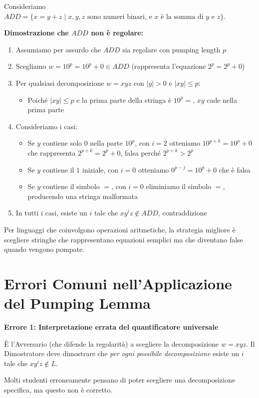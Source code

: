 \documentclass[12pt,a4paper]{article}
\begin{document}
\begin{risoluzione}
Consideriamo $ADD = \{x=y+z\mid x,y,z \text{ sono numeri binari, e } x \text{ è la somma di } y \text{ e } z\}$.

\textbf{Dimostrazione che $ADD$ non è regolare:}
\begin{enumerate}
    \item Assumiamo per assurdo che $ADD$ sia regolare con pumping length $p$
    \item Scegliamo $w = 10^p=10^p+0 \in ADD$ (rappresenta l'equazione $2^p = 2^p + 0$)
    \item Per qualsiasi decomposizione $w = xyz$ con $|y| > 0$ e $|xy| \leq p$:
    \begin{itemize}
        \item Poiché $|xy| \leq p$ e la prima parte della stringa è $10^p=$, $xy$ cade nella prima parte
    \end{itemize}
    \item Consideriamo i casi:
    \begin{itemize}
        \item Se $y$ contiene solo $0$ nella parte $10^p$, con $i = 2$ otteniamo $10^{p+k}=10^p+0$ che rappresenta $2^{p+k} = 2^p + 0$, falsa perché $2^{p+k} > 2^p$
        \item Se $y$ contiene il $1$ iniziale, con $i = 0$ otteniamo $0^{p-j}=10^p+0$ che è falsa
        \item Se $y$ contiene il simbolo $=$, con $i = 0$ eliminiamo il simbolo $=$, producendo una stringa malformata
    \end{itemize}
    \item In tutti i casi, esiste un $i$ tale che $xy^iz \not\in ADD$, contraddizione
\end{enumerate}
\end{risoluzione}

\begin{suggerimento}
Per linguaggi che coinvolgono operazioni aritmetiche, la strategia migliore è scegliere stringhe che rappresentano equazioni semplici ma che diventano false quando vengono pompate.
\end{suggerimento}

\section{Errori Comuni nell'Applicazione del Pumping Lemma}

\begin{errorecomune}
\textbf{Errore 1: Interpretazione errata del quantificatore universale}

È l'Avversario (che difende la regolarità) a scegliere la decomposizione $w = xyz$. Il Dimostratore deve dimostrare che \emph{per ogni possibile decomposizione} esiste un $i$ tale che $xy^iz \not\in L$.

Molti studenti erroneamente pensano di poter scegliere una decomposizione specifica, ma questo non è corretto.
\end{errorecomune}
\end{document}
